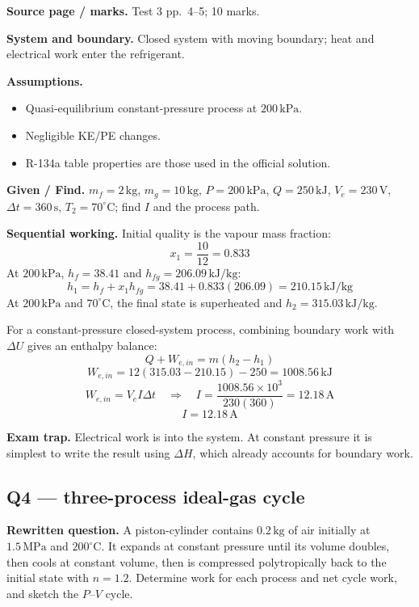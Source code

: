 \textbf{Source page / marks.} Test 3 pp.~4--5; 10 marks.

\textbf{System and boundary.} Closed system with moving boundary; heat and electrical work enter the refrigerant.

\textbf{Assumptions.}
\begin{itemize}
  \item Quasi-equilibrium constant-pressure process at $200\,\mathrm{kPa}$.
  \item Negligible KE/PE changes.
  \item R-134a table properties are those used in the official solution.
\end{itemize}

\textbf{Given / Find.} $m_f=2\,\mathrm{kg}$, $m_g=10\,\mathrm{kg}$, $P=200\,\mathrm{kPa}$, $Q=250\,\mathrm{kJ}$, $V_e=230\,\mathrm{V}$, $\Delta t=360\,\mathrm{s}$, $T_2=70^\circ\mathrm{C}$; find $I$ and the process path.


\textbf{Sequential working.} Initial quality is the vapour mass fraction:
\[
x_1=\frac{10}{12}=0.833
\]
At $200\,\mathrm{kPa}$, $h_f=38.41$ and $h_{fg}=206.09\,\mathrm{kJ/kg}$:
\[
h_1=h_f+x_1h_{fg}=38.41+0.833(206.09)=210.15\,\mathrm{kJ/kg}
\]
At $200\,\mathrm{kPa}$ and $70^\circ\mathrm{C}$, the final state is superheated and $h_2=315.03\,\mathrm{kJ/kg}$.

For a constant-pressure closed-system process, combining boundary work with $\Delta U$ gives an enthalpy balance:
\[
Q+W_{e,in}=m(h_2-h_1)
\]
\[
W_{e,in}=12(315.03-210.15)-250=1008.56\,\mathrm{kJ}
\]
\[
W_{e,in}=V_e I\Delta t\quad\Rightarrow\quad I=\frac{1008.56\times10^3}{230(360)}=12.18\,\mathrm{A}
\]
\[
\boxed{I=12.18\,\mathrm{A}}
\]

\textbf{Exam trap.} Electrical work is into the system. At constant pressure it is simplest to write the result using $\Delta H$, which already accounts for boundary work.

\subsection*{Q4 --- three-process ideal-gas cycle}
\textbf{Rewritten question.} A piston-cylinder contains $0.2\,\mathrm{kg}$ of air initially at $1.5\,\mathrm{MPa}$ and $200^\circ\mathrm{C}$. It expands at constant pressure until its volume doubles, then cools at constant volume, then is compressed polytropically back to the initial state with $n=1.2$. Determine work for each process and net cycle work, and sketch the $P$--$V$ cycle.

